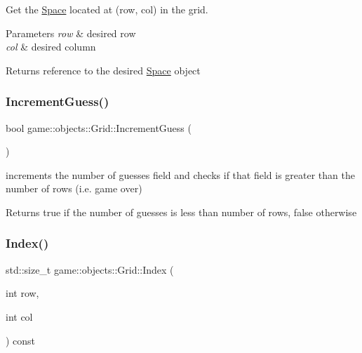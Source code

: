 Get the \hyperlink{classgame_1_1objects_1_1Space}{Space} located at (row, col) in the grid. 


\begin{DoxyParams}{Parameters}
{\em row} & desired row \\
\hline
{\em col} & desired column \\
\hline
\end{DoxyParams}
\begin{DoxyReturn}{Returns}
reference to the desired \hyperlink{classgame_1_1objects_1_1Space}{Space} object 
\end{DoxyReturn}
\mbox{\label{classgame_1_1objects_1_1Grid_a8074b85524ccdff89f5a520699599f32}} 
\subsubsection{\texorpdfstring{Increment\+Guess()}{IncrementGuess()}}
{\footnotesize\ttfamily bool game\+::objects\+::\+Grid\+::\+Increment\+Guess (\begin{DoxyParamCaption}{ }\end{DoxyParamCaption})}



increments the number of guesses field and checks if that field is greater than the number of rows (i.\+e. game over) 

\begin{DoxyReturn}{Returns}
true if the number of guesses is less than number of rows, false otherwise 
\end{DoxyReturn}
\mbox{\label{classgame_1_1objects_1_1Grid_ad6a36b9043e9e5b5318149a9c7908933}} 
\subsubsection{\texorpdfstring{Index()}{Index()}}
{\footnotesize\ttfamily std\+::size\+\_\+t game\+::objects\+::\+Grid\+::\+Index (\begin{DoxyParamCaption}\item[{int}]{row,  }\item[{int}]{col }\end{DoxyParamCaption}) const\hspace{0.3cm}{\ttfamily [inline]}}




